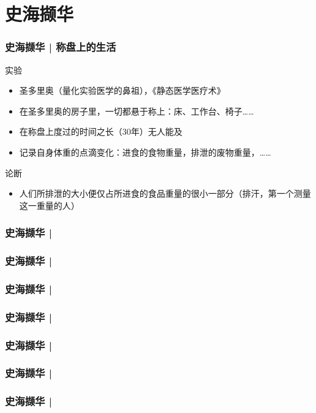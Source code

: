 \section{史海撷华}
\begin{frame}
  \frametitle{史海撷华 | 称盘上的生活}
  \begin{block}{实验}
    \begin{itemize}
      \item 圣多里奥（量化实验医学的鼻祖），《静态医学医疗术》
      \item 在圣多里奥的房子里，一切都悬于称上：床、工作台、椅子……
      \item 在称盘上度过的时间之长（30年）无人能及
      \item 记录自身体重的点滴变化：进食的食物重量，排泄的废物重量，……
    \end{itemize}
  \end{block}
  \pause
  \begin{block}{论断}
    \begin{itemize}
      \item 人们所排泄的大小便仅占所进食的食品重量的很小一部分（排汗，第一个测量这一重量的人）
    \end{itemize}
  \end{block}
\end{frame}

% 
\begin{frame}
  \frametitle{史海撷华 | }
\end{frame}

% 
\begin{frame}
  \frametitle{史海撷华 | }
\end{frame}

% 
\begin{frame}
  \frametitle{史海撷华 | }
\end{frame}

% 
\begin{frame}
  \frametitle{史海撷华 | }
\end{frame}

% 
\begin{frame}
  \frametitle{史海撷华 | }
\end{frame}

% 
\begin{frame}
  \frametitle{史海撷华 | }
\end{frame}

% 
\begin{frame}
  \frametitle{史海撷华 | }
\end{frame}

